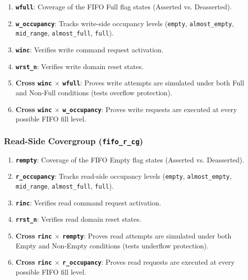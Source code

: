 \documentclass[
]{article}
\providecommand{\tightlist}{%
  \setlength{\itemsep}{0pt}\setlength{\parskip}{0pt}}
\begin{document}
\begin{enumerate}
\def\labelenumi{\arabic{enumi}.}
\tightlist
\item
  \textbf{\texttt{wfull}}: Coverage of the FIFO Full flag states
  (Asserted vs. Deasserted).
\item
  \textbf{\texttt{w\_occupancy}}: Tracks write-side occupancy levels
  (\texttt{empty}, \texttt{almost\_empty}, \texttt{mid\_range},
  \texttt{almost\_full}, \texttt{full}).
\item
  \textbf{\texttt{winc}}: Verifies write command request activation.
\item
  \textbf{\texttt{wrst\_n}}: Verifies write domain reset states.
\item
  \textbf{Cross \texttt{winc} $\times$ \texttt{wfull}}: Proves write attempts
  are simulated under both Full and Non-Full conditions (tests overflow
  protection).
\item
  \textbf{Cross \texttt{winc} $\times$ \texttt{w\_occupancy}}: Proves write
  requests are executed at every possible FIFO fill level.
\end{enumerate}

\subsubsection{\texorpdfstring{Read-Side Covergroup
(\texttt{fifo\_r\_cg})}{Read-Side Covergroup (fifo\_r\_cg)}}\label{read-side-covergroup-fifo_r_cg}

\begin{enumerate}
\def\labelenumi{\arabic{enumi}.}
\setcounter{enumi}{6}
\tightlist
\item
  \textbf{\texttt{rempty}}: Coverage of the FIFO Empty flag states
  (Asserted vs. Deasserted).
\item
  \textbf{\texttt{r\_occupancy}}: Tracks read-side occupancy levels
  (\texttt{empty}, \texttt{almost\_empty}, \texttt{mid\_range},
  \texttt{almost\_full}, \texttt{full}).
\item
  \textbf{\texttt{rinc}}: Verifies read command request activation.
\item
  \textbf{\texttt{rrst\_n}}: Verifies read domain reset states.
\item
  \textbf{Cross \texttt{rinc} $\times$ \texttt{rempty}}: Proves read attempts
  are simulated under both Empty and Non-Empty conditions (tests
  underflow protection).
\item
  \textbf{Cross \texttt{rinc} $\times$ \texttt{r\_occupancy}}: Proves read
  requests are executed at every possible FIFO fill level.
\end{enumerate}
\end{document}
